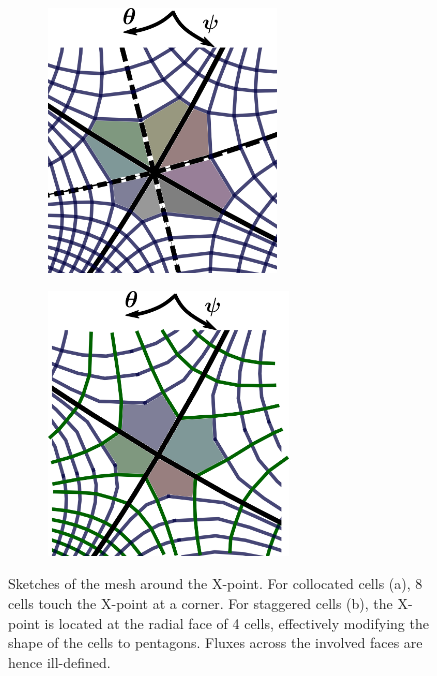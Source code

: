 \begin{figure}[H]
	\centering
	\begin{subfigure}[t]{0.48\textwidth}
		\centering
		\includegraphics[height=7cm]{schemes/XpointCentered.png}
		\label{fig:CenteredXpoint}
	\end{subfigure}
	\begin{subfigure}[t]{0.48\textwidth}
		\centering
		\includegraphics[height=7cm]{schemes/XpointStaggered.png}
		\label{fig:StaggeredXpoint}
	\end{subfigure}
	\caption[Sketches of the mesh around the X-point]{ Sketches of the mesh around the X-point. For collocated cells (a), 8 cells touch the X-point at a corner. For staggered cells (b), the X-point is located at the radial face of 4 cells, effectively modifying the shape of the cells to pentagons. Fluxes across the involved faces are hence ill-defined. }
	\label{fig:XpointDiscretization}
\end{figure}










